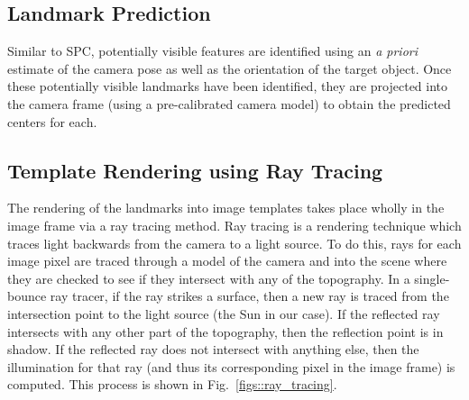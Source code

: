 \documentclass{src/RPI-SIW}
\begin{document}
\subsection*{Landmark Prediction}
Similar to SPC, potentially visible features are identified using an \textit{a priori} estimate of the camera pose as well as the orientation of the target object. Once these potentially visible landmarks have been identified, they are projected into the camera frame (using a pre-calibrated camera model) to obtain the predicted centers for each.

\subsection*{Template Rendering using Ray Tracing}
The rendering of the landmarks into image templates takes place wholly in the image frame via a ray tracing method.  Ray tracing is a rendering technique which traces light backwards from the camera to a light source.  To do this, rays for each image pixel are traced through a model of the camera and into the scene where they are checked to see if they intersect with any of the topography.  In a single-bounce ray tracer, if the ray strikes a surface, then a new ray is traced from the intersection point to the light source (the Sun in our case).  If the reflected ray intersects with any other part of the topography, then the reflection point is in shadow.  If the reflected ray does not intersect with anything else, then the illumination for that ray (and thus its corresponding pixel in the image frame) is computed.  This process is shown in Fig.~\ref{figs::ray_tracing}.
\end{document}
